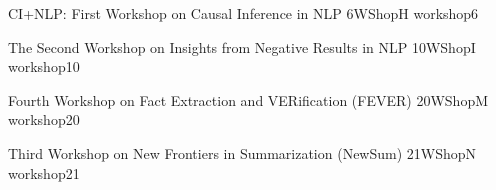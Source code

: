 

\begin{wsschedule}
  {CI+NLP: First Workshop on Causal Inference in NLP}
  {6}{WShopH}
  {workshop6}
  {\WShopLocG}
  
\end{wsschedule}

\begin{wsschedule}
  {The Second Workshop on Insights from Negative Results in NLP}
  {10}{WShopI}
  {workshop10}
  {\WShopLocH}
  
\end{wsschedule}




\begin{wsschedule}
  {Fourth Workshop on Fact Extraction and VERification (FEVER)}
  {20}{WShopM}
  {workshop20}
  {\WShopLocH}
  
\end{wsschedule}

\begin{wsschedule}
  {Third Workshop on New Frontiers in Summarization (NewSum)}
  {21}{WShopN}
  {workshop21}
  {\WShopLocH}
  
\end{wsschedule}


